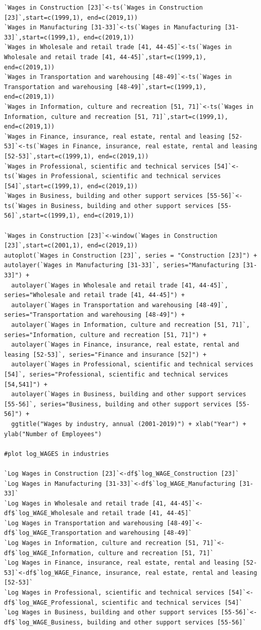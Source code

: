 \documentclass[12pt]{article}
\begin{document}
\begin{verbatim}
`Wages in Construction [23]`<-ts(`Wages in Construction [23]`,start=c(1999,1), end=c(2019,1))
`Wages in Manufacturing [31-33]`<-ts(`Wages in Manufacturing [31-33]`,start=c(1999,1), end=c(2019,1))
`Wages in Wholesale and retail trade [41, 44-45]`<-ts(`Wages in Wholesale and retail trade [41, 44-45]`,start=c(1999,1), end=c(2019,1))
`Wages in Transportation and warehousing [48-49]`<-ts(`Wages in Transportation and warehousing [48-49]`,start=c(1999,1), end=c(2019,1))
`Wages in Information, culture and recreation [51, 71]`<-ts(`Wages in Information, culture and recreation [51, 71]`,start=c(1999,1), end=c(2019,1))
`Wages in Finance, insurance, real estate, rental and leasing [52-53]`<-ts(`Wages in Finance, insurance, real estate, rental and leasing [52-53]`,start=c(1999,1), end=c(2019,1))
`Wages in Professional, scientific and technical services [54]`<-ts(`Wages in Professional, scientific and technical services [54]`,start=c(1999,1), end=c(2019,1))
`Wages in Business, building and other support services [55-56]`<-ts(`Wages in Business, building and other support services [55-56]`,start=c(1999,1), end=c(2019,1))

`Wages in Construction [23]`<-window(`Wages in Construction [23]`,start=c(2001,1), end=c(2019,1)) 
autoplot(`Wages in Construction [23]`, series = "Construction [23]") + autolayer(`Wages in Manufacturing [31-33]`, series="Manufacturing [31-33]") +
  autolayer(`Wages in Wholesale and retail trade [41, 44-45]`, series="Wholesale and retail trade [41, 44-45]") +
  autolayer(`Wages in Transportation and warehousing [48-49]`, series="Transportation and warehousing [48-49]") +
  autolayer(`Wages in Information, culture and recreation [51, 71]`, series="Information, culture and recreation [51, 71]") +
  autolayer(`Wages in Finance, insurance, real estate, rental and leasing [52-53]`, series="Finance and insurance [52]") +
  autolayer(`Wages in Professional, scientific and technical services [54]`, series="Professional, scientific and technical services [54,541]") +
  autolayer(`Wages in Business, building and other support services [55-56]`, series="Business, building and other support services [55-56]") +
  ggtitle("Wages by industry, annual (2001-2019)") + xlab("Year") + ylab("Number of Employees")

#plot log_WAGES in industries

`Log Wages in Construction [23]`<-df$`log_WAGE_Construction [23]`
`Log Wages in Manufacturing [31-33]`<-df$`log_WAGE_Manufacturing [31-33]`
`Log Wages in Wholesale and retail trade [41, 44-45]`<-df$`log_WAGE_Wholesale and retail trade [41, 44-45]`
`Log Wages in Transportation and warehousing [48-49]`<-df$`log_WAGE_Transportation and warehousing [48-49]`
`Log Wages in Information, culture and recreation [51, 71]`<-df$`log_WAGE_Information, culture and recreation [51, 71]`
`Log Wages in Finance, insurance, real estate, rental and leasing [52-53]`<-df$`log_WAGE_Finance, insurance, real estate, rental and leasing [52-53]`
`Log Wages in Professional, scientific and technical services [54]`<-df$`log_WAGE_Professional, scientific and technical services [54]`
`Log Wages in Business, building and other support services [55-56]`<-df$`log_WAGE_Business, building and other support services [55-56]`


\end{verbatim}
\end{document}
